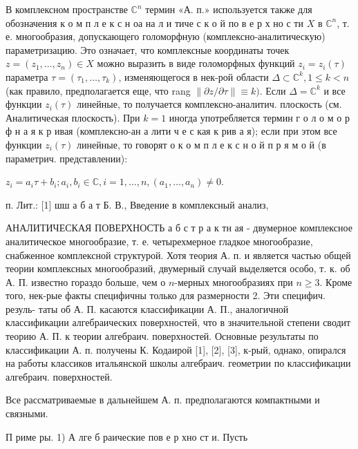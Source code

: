 \documentclass[10pt]{article}
\begin{document}
В комплексном пространстве $\mathbb{C}^{n}$ термин «А. п.» используется также для обозначения к о м п л е к с н оа на л и тиче с к о й по в е р х но с ти $X$ в $\mathbb{C}^{n}$, т. е. многообразия, допускающего голоморфную (комплексно-аналитическую) параметризацию. Это означает, что комплексные координаты точек $z=\left(z_{1}, \ldots, z_{n}\right) \in X$ можно выразить в виде голоморфных функций $z_{i}=z_{i}(\tau)$ параметра $\tau=\left(\tau_{1}, \ldots, \tau_{k}\right)$, изменяющегося в нек-рой области $\Delta \subset \mathbb{C}^{k}, 1 \leqslant k<n$ (как правило, предполагается еще, что rang $\|\partial z / \partial \tau\| \equiv k)$. Если $\Delta=\mathbb{C}^{k}$ и все функции $z_{i}(\tau)$ линейные, то получается комплексно-аналитич. плоскость (см. Аналитическая плоскость). При $k=1$ иногда употребляется термин г о л о м о р ф н а я к р ивая (комплексно-ан а лити ч е с кая к рив а я); если при этом все функции $z_{i}(\tau)$ линейные, то говорят $о$ к о м п л е к с н о й п р я м о й (в параметрич. представлении):



$z_{i}=a_{i} \tau+b_{i} ; a_{i}, b_{i} \in \mathbb{C}, i=1, \ldots, n,\left(a_{1}, \ldots, a_{n}\right) \neq 0$.



п. Лит.: [1] шш а б а т Б. В., Введение в комплексный анализ,



АНАЛИТИЧЕСКАЯ ПОВЕРХНОСТЬ а б с т р а к тн ая - двумерное комплексное аналитическое многообразие, т. е. четырехмерное гладкое многообразие, снабженное комплексной структурой. Хотя теория А. п. и является частью общей теории комплексных многообразий, двумерный случай выделяется особо, т. к. об А. П. известно гораздо больше, чем о $n$-мерных многообразиях при $n \geqslant 3$. Кроме того, нек-рые факты специфичны только для размерности 2. Эти специфич. резуль- таты об А. П. касаются классификации А. П., аналогичной классификации алгебраических поверхностей, что в значительной степени сводит теорию А. П. к теории алгебраич. поверхностей. Основные результаты по классификации А. п. получены К. Кодаирой [1], [2], [3], к-рый, однако, опирался на работы классиков итальянской школы алгебраич. геометрии по классификации алгебраич. поверхностей.



Все рассматриваемые в дальнейшем А. п. предполагаются компактными и связными.



П риме ры. 1) А лге б раические пов е р хно ст и. Пусть
\end{document}
